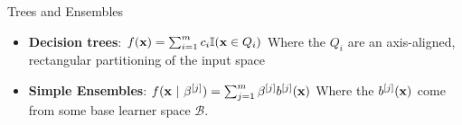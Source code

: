 \documentclass[11pt,compress,t,notes=noshow, xcolor=table]{beamer}
\begin{document}
\begin{vbframe}{Trees and Ensembles}

\begin{itemize}
  \item \textbf{Decision trees}: $f(\mathbf{x}) = \sum_{i = 1}^m c_i \mathbb{I}(\mathbf{x} \in Q_i)$ 
    Where the $Q_i$ are an axis-aligned, rectangular partitioning of the input space
  \begin{figure}
    \centering
  \end{figure}

\item \textbf{Simple Ensembles}: $ f(\mathbf{x}~|~\beta^{[j]}) = \sum_{j=1}^m \beta^{[j]} b^{[j]}(\mathbf{x})$  Where the $b^{[j]}(\mathbf{x})$ come from some base learner space $\mathcal{B}$.
  \begin{figure}
    \centering
  \end{figure}

  \end{itemize}

\end{vbframe}
\end{document}
